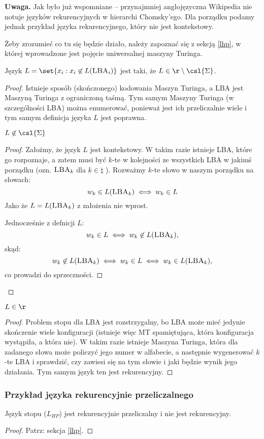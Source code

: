 \textbf{Uwaga.} Jak było już wspomniane -- przynajmniej anglojęzyczna Wikipedia nie notuje języków rekurencyjnych w hierarchi Chomsky'ego. Dla porządku podamy jednak przykład języka rekurencyjnego, który nie jest kontekstowy. 

Żeby zrozumieć co tu się będzie działo, należy zapoznać się z sekcją \ref{lhp}, w której wprowadzone jest pojęcie uniwersalnej maszyny Turinga. 

\begin{theorem}
    Język \( L = \set{x_i : x_i \not \in L(\textsc{LBA}_i)} \) jest taki, że \( L \in \r \setminus \csl{\Sigma}\).
\end{theorem}
\begin{proof}
    Istnieje sposób (skończonego) kodowania Maszyn Turinga, a LBA jest Maszyną Turinga z ograniczoną taśmą. Tym samym Maszyny Turinga (w szczególności LBA) można enumerować, ponieważ jest ich przeliczalnie wiele i tym samym definicja języka \( L \) jest poprawna.
        
    \begin{lemma}
        \( L \not \in \csl{\Sigma}\)
    \end{lemma}
    \begin{proof}
        Założmy, że język \(L\) jest kontekstowy. W takim razie istnieje LBA, które go rozpoznaje, a zatem musi być \(k\)-te w kolejności ze wszystkich LBA w jakimś porządku (ozn. \( \textsc{LBA}_k \) dla \(k \in \natural \) ). Rozważmy \(k\)-te słowo w naszym porządku na słowach:
        \[ w_k \in L(\textsc{LBA}_k) \iff w_k \in L \]
        Jako że \( L = L(\textsc{LBA}_k) \) z założenia nie wprost. 
        
        Jednocześnie z defnicji \(L\):
        \[ w_k \in L  \iff w_k \not \in  L(\textsc{LBA}_k), \]
        skąd:
        \[ w_k \not \in  L(\textsc{LBA}_k) \iff w_k \in L \iff w_k \in L(\textsc{LBA}_k), \]
        co prowadzi do sprzeczności.
    \end{proof}
\end{proof}

    \begin{lemma}
        \( L \in \r \)
    \end{lemma}
    \begin{proof}
        Problem stopu dla LBA jest rozstrzygalny, bo LBA może mieć jedynie skończenie wiele konfiguracji (istnieje więc MT spamiętująca, która konfiguracja wystąpiła, a która nie). W takim razie istnieje Maszyna Turinga, która dla zadanego słowa może policzyć jego numer w alfabecie, a następnie wygenerować \(k\)-te LBA i sprawdzić, czy zawiesi się na tym słowie i jaki będzie wynik jego działania. Tym samym język ten jest rekurencyjny. 
    \end{proof}

\subsubsection{Przykład języka rekurencyjnie przeliczalnego}

\begin{theorem}
    Język stopu (\(L_{HP}\)) jest rekurencyjnie przeliczalny i nie jest rekurencyjny. 
\end{theorem}
\begin{proof}
    Patrz: sekcja \ref{lhp}.
\end{proof}